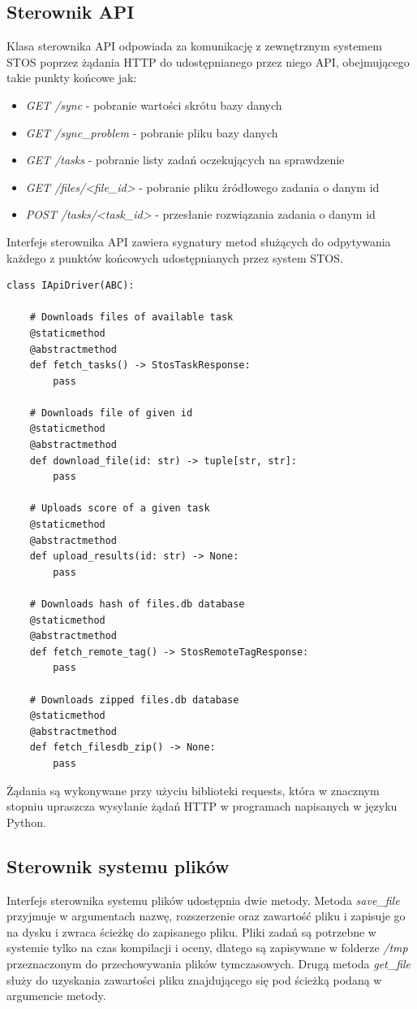 \subsection{Sterownik API}
Klasa sterownika API odpowiada za komunikację z zewnętrznym systemem STOS poprzez żądania HTTP do udostępnianego przez niego API, obejmującego takie punkty końcowe jak:
\begin{itemize}
    \item \textit{GET /sync} - pobranie wartości skrótu bazy danych
    \item \textit{GET /sync\_problem} - pobranie pliku bazy danych
    \item \textit{GET /tasks} - pobranie listy zadań oczekujących na sprawdzenie
    \item \textit{GET /files/<file\_id>} - pobranie pliku źródłowego zadania o danym id
    \item \textit{POST /tasks/<task\_id>} - przesłanie rozwiązania zadania o danym id
\end{itemize}
Interfejs sterownika API zawiera sygnatury metod służących do odpytywania każdego z punktów końcowych udostępnianych przez system STOS.
\lstset{style=python}
\begin{lstlisting}[caption = {Interfejs sterownika API.}]
    class IApiDriver(ABC):

    # Downloads files of available task
    @staticmethod
    @abstractmethod
    def fetch_tasks() -> StosTaskResponse:
        pass

    # Downloads file of given id
    @staticmethod
    @abstractmethod
    def download_file(id: str) -> tuple[str, str]:
        pass

    # Uploads score of a given task
    @staticmethod
    @abstractmethod
    def upload_results(id: str) -> None:
        pass

    # Downloads hash of files.db database
    @staticmethod
    @abstractmethod
    def fetch_remote_tag() -> StosRemoteTagResponse: 
        pass

    # Downloads zipped files.db database
    @staticmethod
    @abstractmethod
    def fetch_filesdb_zip() -> None:
        pass
\end{lstlisting}
Żądania są wykonywane przy użyciu biblioteki requests\cite{pythonRequests}, która w znacznym stopniu upraszcza wysyłanie żądań HTTP w programach napisanych w języku Python.

\subsection{Sterownik systemu plików}
Interfejs sterownika systemu plików udostępnia dwie metody. Metoda \textit{save\_file} przyjmuje w argumentach nazwę, rozszerzenie oraz zawartość pliku i zapisuje go na dysku i zwraca ścieżkę do zapisanego pliku. Pliki zadań są potrzebne w systemie tylko na czas kompilacji i oceny, dlatego są zapisywane w folderze \textit{/tmp} przeznaczonym do przechowywania plików tymczasowych. Drugą metoda \textit{get\_file} służy do uzyskania zawartości pliku znajdującego się pod ścieżką podaną w argumencie metody.

